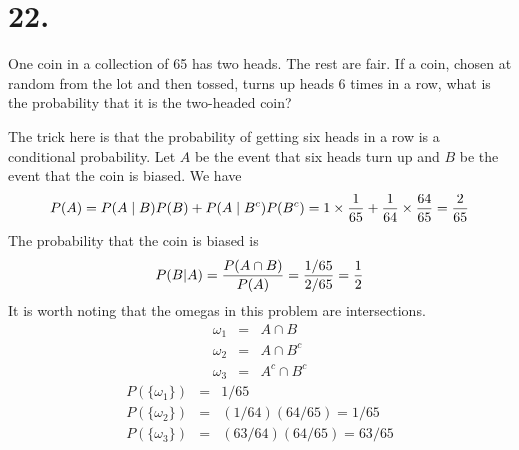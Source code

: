 \section*{22.}

One coin in a collection of 65 has two heads. The rest are fair. If a coin,
chosen at random from the lot and then tossed, turns up heads 6 times in a
row, what is the probability that it is the two-headed coin?

\bigskip
\noindent
The trick here is that the probability of getting six heads in a row
is a conditional probability.
Let $A$ be the event that six heads turn up and $B$ be the event that the
coin is biased. We have
$$P(A)=P(A\mid B)P(B)+P(A\mid B^c)P(B^c)=
1\times{1\over65}+{1\over64}\times{64\over65}={2\over65}$$
The probability that the coin is biased is
$$P(B|A)={P(A\cap B)\over P(A)}={1/65\over 2/65}={1\over2}$$
It is worth noting that the omegas in this problem are intersections.
\begin{eqnarray*}
\omega_1&=&A\cap B \\
\omega_2&=&A\cap B^c \\
\omega_3&=&A^c\cap B^c
\end{eqnarray*}
\begin{eqnarray*}
P(\{\omega_1\})&=&1/65 \\
P(\{\omega_2\})&=&(1/64)(64/65)=1/65 \\
P(\{\omega_3\})&=&(63/64)(64/65)=63/65
\end{eqnarray*}


